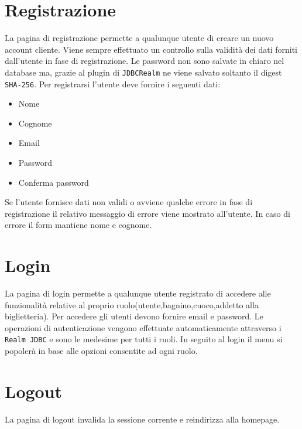\documentclass{article}
\begin{document}
\section{Registrazione}
La pagina di registrazione permette a qualunque utente di creare un nuovo account cliente. Viene sempre effettuato un controllo sulla validità dei dati forniti dall'utente in fase di registrazione. Le password non sono salvate in chiaro nel database ma, grazie al plugin di \texttt{JDBCRealm} ne viene salvato soltanto il digest \texttt{SHA-256}.
Per registrarsi l'utente deve fornire i seguenti dati:
\begin{itemize}
	\item Nome
	\item Cognome
	\item Email
	\item Password
	\item Conferma password
\end{itemize}
Se l'utente fornisce dati non validi o avviene qualche errore in fase di registrazione il relativo messaggio di errore viene mostrato all'utente. In caso di errore il form mantiene nome e cognome.

\section{Login}
La pagina di login permette a qualunque utente registrato di accedere alle funzionalità relative al proprio ruolo(utente,bagnino,cuoco,addetto alla biglietteria). Per accedere gli utenti devono fornire email e password. Le operazioni di autenticazione vengono effettuate automaticamente attraverso i \texttt{Realm JDBC} e sono le medesime per tutti i ruoli. In seguito al login il menu si popolerà in base alle opzioni consentite ad ogni ruolo.

\section{Logout}
La pagina di logout invalida la sessione corrente e reindirizza alla homepage.
\end{document}
